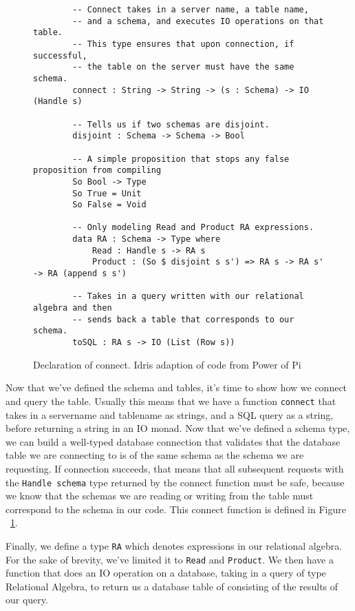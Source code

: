 \begin{figure}[ht!]
    \caption{Declaration of connect. Idris adaption of code from Power of Pi
    \protect\cite{power_of_pi}}
    \label{connect}
    \begin{lstlisting}
        -- Connect takes in a server name, a table name, 
        -- and a schema, and executes IO operations on that table. 
        -- This type ensures that upon connection, if successful, 
        -- the table on the server must have the same schema. 
        connect : String -> String -> (s : Schema) -> IO (Handle s)

        -- Tells us if two schemas are disjoint. 
        disjoint : Schema -> Schema -> Bool

        -- A simple proposition that stops any false proposition from compiling
        So Bool -> Type
        So True = Unit
        So False = Void

        -- Only modeling Read and Product RA expressions.
        data RA : Schema -> Type where
            Read : Handle s -> RA s
            Product : (So $ disjoint s s') => RA s -> RA s' -> RA (append s s')
        
        -- Takes in a query written with our relational algebra and then 
        -- sends back a table that corresponds to our schema. 
        toSQL : RA s -> IO (List (Row s))
    \end{lstlisting}
\end{figure}

Now that we've defined the schema and tables, it's time to show how we connect
and query the table. Usually this means that we have a function \texttt{connect}
that takes in a servername and tablename as strings, and a SQL query as a
string, before returning a string in an IO monad. Now that we've defined a
schema type, we can build a well-typed database connection that validates that
the database table we are connecting to is of the same schema as the schema we
are requesting. If connection succeeds, that means that all subsequent requests
with the \texttt{Handle schema} type returned by the connect function must be
safe, because we know that the schemas we are reading or writing from the table
must correspond to the schema in our code. This connect function is defined in
Figure ~\ref{connect}. 

Finally, we define a type \texttt{RA} which denotes expressions in our
relational algebra. For the sake of brevity, we've limited it to \texttt{Read}
and \texttt{Product}. We then have a function that does an IO operation on a
database, taking in a query of type Relational Algebra, to return us a database
table of consisting of the results of our query. 

